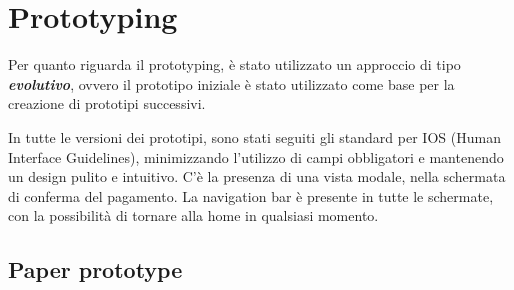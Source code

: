 \documentclass{article}
\begin{document}
\section{Prototyping}

Per quanto riguarda il prototyping, è stato utilizzato un approccio di tipo \textit{\textbf{evolutivo}}, ovvero il prototipo iniziale è stato utilizzato come base per la creazione di prototipi successivi.

In tutte le versioni dei prototipi, sono stati seguiti gli standard per IOS (Human Interface Guidelines), minimizzando l'utilizzo di campi obbligatori e mantenendo un design pulito e intuitivo.
C'è la presenza di una vista modale, nella schermata di conferma del pagamento.
La navigation bar è presente in tutte le schermate, con la possibilità di tornare alla home in qualsiasi momento.

\subsection{Paper prototype}
\end{document}

